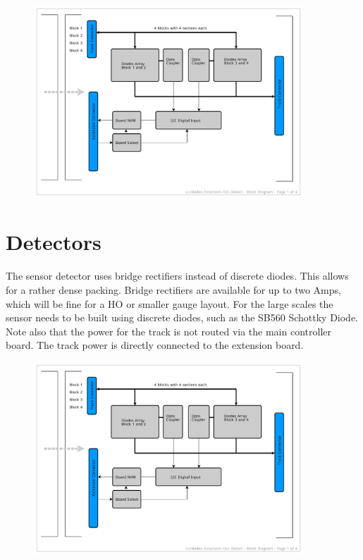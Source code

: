 \begin{figure}[htbp]
    \centering
    \includegraphics[page=2, width=0.9\textwidth]{./Schematics/Schematic_LcsNodes-Extension-Occ-Detect.pdf}
\end{figure}
\FloatBarrier

\section{Detectors}

The sensor detector uses bridge rectifiers instead of discrete diodes. This allows for a rather dense packing. Bridge rectifiers are available for up to two Amps, which will be fine for a HO or smaller gauge layout. For the large scales the sensor needs to be built using discrete diodes, such as the SB560 Schottky Diode. Note also that the power for the track is not routed via the main controller board. The track power is directly connected to the extension board.

\begin{figure}[htbp]
    \centering
    \includegraphics[page=3, width=0.9\textwidth]{./Schematics/Schematic_LcsNodes-Extension-Occ-Detect.pdf}
\end{figure}
\FloatBarrier

